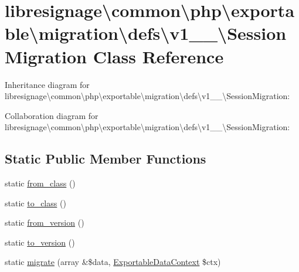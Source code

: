 \hypertarget{classlibresignage_1_1common_1_1php_1_1exportable_1_1migration_1_1defs_1_1v1__1__0_1_1SessionMigration}{}\section{libresignage\textbackslash{}common\textbackslash{}php\textbackslash{}exportable\textbackslash{}migration\textbackslash{}defs\textbackslash{}v1\+\_\+\_\textbackslash{}Session\+Migration Class Reference}
\label{classlibresignage_1_1common_1_1php_1_1exportable_1_1migration_1_1defs_1_1v1__1__0_1_1SessionMigration}


Inheritance diagram for libresignage\textbackslash{}common\textbackslash{}php\textbackslash{}exportable\textbackslash{}migration\textbackslash{}defs\textbackslash{}v1\+\_\+\_\textbackslash{}Session\+Migration\+:


Collaboration diagram for libresignage\textbackslash{}common\textbackslash{}php\textbackslash{}exportable\textbackslash{}migration\textbackslash{}defs\textbackslash{}v1\+\_\+\_\textbackslash{}Session\+Migration\+:
\subsection*{Static Public Member Functions}
\begin{DoxyCompactItemize}
\item 
static \hyperlink{classlibresignage_1_1common_1_1php_1_1exportable_1_1migration_1_1defs_1_1v1__1__0_1_1SessionMigration_a4dad85abc8be087b615b36aa7b0257bc}{from\+\_\+class} ()
\item 
static \hyperlink{classlibresignage_1_1common_1_1php_1_1exportable_1_1migration_1_1defs_1_1v1__1__0_1_1SessionMigration_a18278527a7e72394990621ee1b345cee}{to\+\_\+class} ()
\item 
static \hyperlink{classlibresignage_1_1common_1_1php_1_1exportable_1_1migration_1_1defs_1_1v1__1__0_1_1SessionMigration_aa595db2e237317485b4dcddf3670ee82}{from\+\_\+version} ()
\item 
static \hyperlink{classlibresignage_1_1common_1_1php_1_1exportable_1_1migration_1_1defs_1_1v1__1__0_1_1SessionMigration_abcbefa69fc1a771be466bcc364dfe822}{to\+\_\+version} ()
\item 
static \hyperlink{classlibresignage_1_1common_1_1php_1_1exportable_1_1migration_1_1defs_1_1v1__1__0_1_1SessionMigration_a9817d1a4aeb11194ca370ecd540cc232}{migrate} (array \&\$data, \hyperlink{classlibresignage_1_1common_1_1php_1_1exportable_1_1ExportableDataContext}{Exportable\+Data\+Context} \$ctx)
\end{DoxyCompactItemize}


